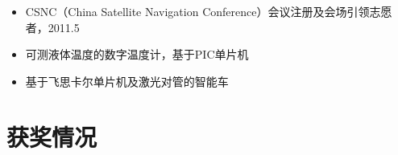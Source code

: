 \begin{CJK}{UTF8}{hei}
\begin{itemize}
\begin{itemize}
  \item CSNC（China Satellite Navigation Conference）会议注册及会场引领志愿者，2011.5
  \end{itemize}
\end{itemize}
\begin{itemize}
  \item 可测液体温度的数字温度计，基于PIC单片机
  \item 基于飞思卡尔单片机及激光对管的智能车
\end{itemize}
%
%

\section{获奖情况}


\end{CJK}
